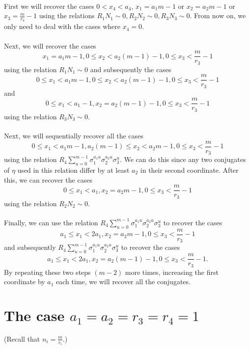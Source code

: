 \documentclass[12pt,a4paper]{article}
\begin{document}
\paragraph*{}
First we will recover the cases $0<x_4<a_4$, $x_1=a_1m-1$ or $x_2=a_2m-1$ or $x_3=\frac{m}{r_3}-1$ using the relations $R_1N_1\sim 0, R_2N_2\sim 0, R_3N_3\sim 0$. From now on, we only need to deal with the cases where $x_4=0$.
\paragraph*{}
Next, we will recover the cases $$x_1=a_1m-1, 0\leq x_2 < a_2(m-1)-1, 0\leq x_3 <\frac{m}{r_3}-1$$ using the relation $R_1N_1\sim 0$ and subsequently the cases $$0\leq x_1 < a_1m-1, 0\leq x_2 < a_2(m-1)-1, 0\leq x_3 <\frac{m}{r_3}-1$$ and $$0\leq x_1 < a_1-1, x_2 = a_2(m-1)-1, 0\leq x_3 <\frac{m}{r_3}-1$$ using the relation $R_3N_3\sim 0$.
\paragraph*{}
Next, we will sequentially recover all the cases $$0\leq x_1 < a_1m-1, a_2(m-1)\leq x_2 < a_2m-1, 0\leq x_3 <\frac{m}{r_3}-1$$
using the relation $R_4\sum_{u=0}^{m-1}\sigma_1^{a_1u}\sigma_2^{a_2u}\sigma_3^u$. We can do this since any two conjugates of $\eta$ used in this relation differ by at least $a_2$ in their second coordinate. After this, we can recover the cases $$0\leq x_1 < a_1, x_2 = a_2m-1, 0\leq x_3 <\frac{m}{r_3}-1$$ using the relation $R_2N_2\sim 0$.
\paragraph*{}
Finally, we can use the relation $R_4\sum_{u=0}^{m-1}\sigma_1^{a_1u}\sigma_2^{a_2u}\sigma_3^u$ to recover the cases $$a_1 \leq x_1 <2a_1, x_2 =a_2m-1, 0\leq x_3 <\frac{m}{r_3}-1$$ and subsequently $R_4\sum_{u=0}^{m-1}\sigma_1^{a_1u}\sigma_2^{a_2u}\sigma_3^u$ to recover the cases $$a_1 \leq x_1 <2a_1, x_2 =a_2(m-1)-1, 0\leq x_3 <\frac{m}{r_3}-1.$$ By repeating these two steps $(m-2)$ more times, increasing the first coordinate by $a_1$ each time, we will recover all the conjugates.

\section{The case $a_1=a_2=r_3=r_4=1$}
(Recall that $n_i=\frac{m}{r_i}$.)
\end{document}
